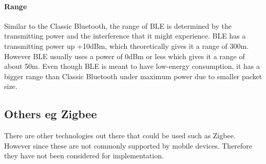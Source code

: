 \paragraph*{Range\protect \\
}

Similar to the Classic Bluetooth, the range of BLE is determined by
the transmitting power and the interference that it might experience.
BLE has a transmitting power up +10dBm, which theoretically gives it a range of
300m\cite{bluetooth-chalmers}. However BLE usually uses a power of 0dBm or less
which gives it a range of about 50m. Even though BLE is meant to have
low-energy consumption, it has a bigger range than Classic Bluetooth
under maximum power due to smaller packet size. 


\subsection{Others eg Zigbee}

There are other technologies out there that could be used such
as Zigbee\cite{zigbee}. However since these are not commonly supported by mobile
devices. Therefore they have not been considered for implementation.




